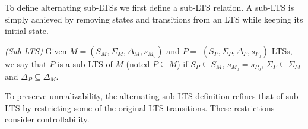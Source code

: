 

To define alternating sub-LTSs we first define a sub-LTS relation.  A sub-LTS is simply achieved by removing states and transitions from an LTS while keeping its initial state.

\begin{definition}\label{def:lts-inclusion}\emph{(Sub-LTS)}
Given $M = (S_M, \Sigma_M, \Delta_M, s_{M_0})$ and
 $P =$ $(S_P,\Sigma_P,\Delta_P,s_{P_0})$ LTSs, 
we say that $P$ is a sub-LTS of $M$ (noted $P \subseteq M$) if $S_P \subseteq S_M$,
$s_{M_0} = s_{P_0}$, $\Sigma_P \subseteq \Sigma_M$ and $\Delta_P \subseteq \Delta_M$.
\end{definition}




To preserve unrealizability, the alternating sub-LTS definition refines that of sub-LTS by restricting some of the original LTS transitions. 
These restrictions consider controllability. 



